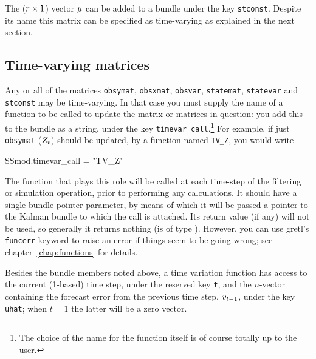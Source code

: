 The ($r \times 1$) vector $\mu$ can be added to a bundle
under the key \texttt{stconst}. Despite its name this matrix can be
specified as time-varying as explained in the next section.

\subsection{Time-varying matrices}
\label{sec:tvarying}

Any or all of the matrices \texttt{obsymat}, \texttt{obsxmat},
\texttt{obsvar}, \texttt{statemat}, \texttt{statevar} and
\texttt{stconst} may be time-varying.  In that case you must supply
the name of a function to be called to update the matrix or matrices
in question: you add this to the bundle as a string, under the key
\texttt{timevar\_call}.\footnote{The choice of the name for the
  function itself is of course totally up to the user.} For example,
if just \texttt{obsymat} ($Z_t$) should be updated, by a
function named \texttt{TV\_Z}, you would write
%
\begin{code}
SSmod.timevar_call = "TV_Z"
\end{code}
%
The function that plays this role will be called at each time-step of
the filtering or simulation operation, prior to performing any
calculations. It should have a single bundle-pointer parameter, by
means of which it will be passed a pointer to the Kalman bundle to
which the call is attached.  Its return value (if any) will not be
used, so generally it returns nothing (is of type ).
However, you can use gretl's \texttt{funcerr} keyword to raise an
error if things seem to be going wrong; see
chapter~\ref{chap:functions} for details.

Besides the bundle members noted above, a time variation function has
access to the current (1-based) time step, under the reserved key
\texttt{t}, and the $n$-vector containing the forecast error from the
previous time step, $v_{t-1}$, under the key \texttt{uhat};
when $t=1$ the latter will be a zero vector.

